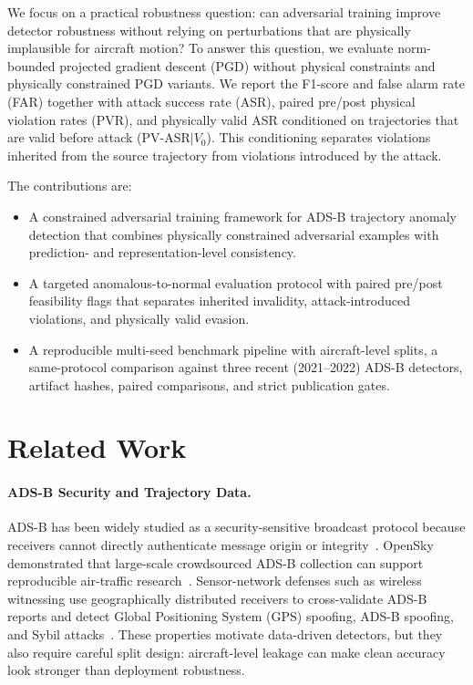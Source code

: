 \documentclass[runningheads]{llncs}
\begin{document}
We focus on a practical robustness question: can adversarial training improve detector robustness without relying on perturbations that are physically implausible for aircraft motion?
To answer this question, we evaluate norm-bounded projected gradient descent (PGD) without physical constraints and physically constrained PGD variants.
We report the F1-score and false alarm rate (FAR) together with attack success rate (ASR), paired pre/post physical violation rates (PVR), and physically valid ASR conditioned on trajectories that are valid before attack (PV-ASR$\mid V_0$).
This conditioning separates violations inherited from the source trajectory from violations introduced by the attack.

The contributions are:
\begin{itemize}
\item A constrained adversarial training framework for ADS-B trajectory anomaly detection that combines physically constrained adversarial examples with prediction- and representation-level consistency.
\item A targeted anomalous-to-normal evaluation protocol with paired pre/post feasibility flags that separates inherited invalidity, attack-introduced violations, and physically valid evasion.
\item A reproducible multi-seed benchmark pipeline with aircraft-level splits, a same-protocol comparison against three recent (2021--2022) ADS-B detectors, artifact hashes, paired comparisons, and strict publication gates.
\end{itemize}

\section{Related Work}
\label{sec:related_work}

\paragraph{ADS-B Security and Trajectory Data.}
ADS-B has been widely studied as a security-sensitive broadcast protocol because receivers cannot directly authenticate message origin or integrity~\cite{strohmeier2015security}.
OpenSky demonstrated that large-scale crowdsourced ADS-B collection can support reproducible air-traffic research~\cite{schaefer2014opensky}.
Sensor-network defenses such as wireless witnessing use geographically distributed receivers to cross-validate ADS-B reports and detect Global Positioning System (GPS) spoofing, ADS-B spoofing, and Sybil attacks~\cite{jansen2021trust}.
These properties motivate data-driven detectors, but they also require careful split design: aircraft-level leakage can make clean accuracy look stronger than deployment robustness.
\end{document}
